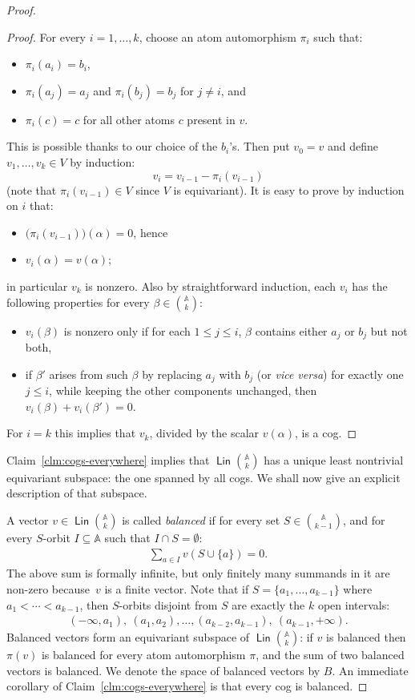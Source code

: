 \documentclass[10pt,a4paper]{amsart}
\numberwithin{equation}{section}
\newcommand{\atoms}{\mathbb A}
\DeclareMathOperator{\lin}{\mathsf{Lin}}
\begin{document}
\begin{proof}
\begin{proof}
For every $i=1,\ldots,k$, choose an atom automorphism $\pi_i$ such that:
\begin{itemize}
\item $\pi_i(a_i)=b_i$, 
\item $\pi_i(a_j)=a_j$ and $\pi_i(b_j)=b_j$ for $j\neq i$, and
\item $\pi_i(c)=c$ for all other atoms $c$ present in $v$.
\end{itemize}
This is possible thanks to our choice of the $b_i$'s. Then put $v_0=v$ and define  $v_1,\ldots,v_k\in V$ by induction:
\[
	v_i = v_{i-1} - \pi_i(v_{i-1}) 
\]
(note that $\pi_i(v_{i-1})\in V$ since $V$ is equivariant). It is easy to prove by induction on $i$ that: 
\begin{itemize}
\item $\big(\pi_i(v_{i-1})\big)(\alpha)=0$, hence
\item $v_{i}(\alpha) = v(\alpha)$;
\end{itemize}
in particular $v_k$ is nonzero.
Also by straightforward induction, each $v_i$ has the following properties for every $\beta\in{\atoms\choose k}$:
\begin{itemize}
\item $v_i(\beta)$ is nonzero only if for each $1\leq j\leq i$, $\beta$ contains either $a_j$ or  $b_j$ but not both,
\item if $\beta'$ arises from such $\beta$ by replacing $a_j$ with $b_j$ (or {\em vice versa}) for exactly one $j\leq i$, while keeping the other components unchanged, then $v_i(\beta)+v_i(\beta')=0$.
\end{itemize}
For $i=k$ this implies that $v_k$, divided by the scalar $v(\alpha)$, is a cog.
\end{proof}

Claim~\ref{clm:cogs-everywhere} implies that $\lin{\atoms\choose k}$ has a unique least nontrivial equivariant subspace: the one spanned by all cogs. We shall now give an explicit description of that subspace.

A vector $v\in\lin{\atoms\choose k}$ is called {\em balanced} if for every set $S\in{\atoms\choose{k-1}}$, and for every $S$-orbit $I\subseteq\atoms$ such that $I\cap S=\emptyset$:
\begin{align}\label{balanced}
	\textstyle \sum_{a\in I}v(S\cup\{a\})=0.
\end{align}
The above sum is formally infinite, but only finitely many summands in it are non-zero because~$v$ is a finite vector.
Note that if $S=\{a_1,\ldots,a_{k-1}\}$ where $a_1<\cdots<a_{k-1}$, then $S$-orbits disjoint from $S$ are exactly the $k$ open intervals:
\begin{align}\label{orbits}
	(-\infty,a_1),\ (a_1,a_2),\ldots,(a_{k-2},a_{k-1}),\ (a_{k-1},+\infty).
\end{align}
Balanced vectors form an equivariant subspace of $\lin{\atoms\choose k}$: if $v$ is balanced then $\pi(v)$ is balanced for every atom automorphism $\pi$, and the sum of two balanced vectors is balanced. We denote the space of balanced vectors by $B$. An immediate corollary of Claim~\ref{clm:cogs-everywhere} is that every cog is balanced.


\end{proof}
\end{document}
